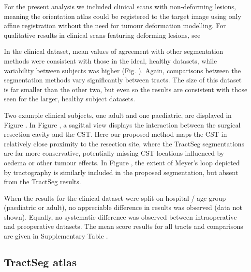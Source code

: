 For the present analysis we included clinical scans with non-deforming lesions, meaning the orientation atlas could be registered to the target image using only affine registration without the need for tumour deformation modelling.
For qualitative results in clinical scans featuring deforming lesions, see \textcite{Young2022}

In the clinical dataset, mean values of agreement with other segmentation methods were consistent with those in the ideal, healthy datasets, while variability between subjects was higher (Fig. ).
Again, comparisons between the segmentation methods vary significantly between tracts.
The size of this dataset is far smaller than the other two, but even so the results are consistent with those seen for the larger, healthy subject datasets.

Two example clinical subjects, one adult and one paediatric, are displayed in Figure .
In Figure , a sagittal view displays the interaction between the surgical resection cavity and the CST.
Here our proposed method maps the CST in relatively close proximity to the resection site, where the TractSeg segmentations are far more conservative, potentially missing CST locations influenced by oedema or other tumour effects.
In Figure , the extent of Meyer's loop depicted by tractography is similarly included in the proposed segmentation, but absent from the TractSeg results.

When the results for the clinical dataset were split on hospital / age group (paediatric or adult), no appreciable difference in results was observed (data not shown).
Equally, no systematic difference was observed between intraoperative and preoperative datasets.
The mean score results for all tracts and comparisons are given in Supplementary Table .


\subsection{TractSeg atlas}

